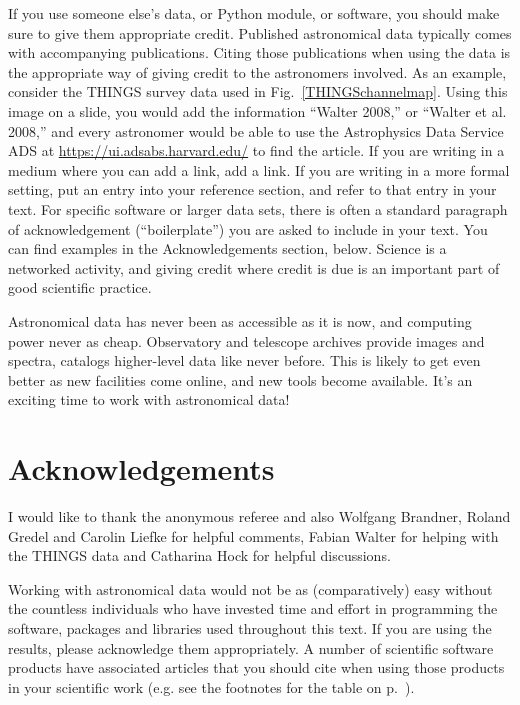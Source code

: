 \documentclass[twocolumn,apj]{openjournal}
\begin{document}
If you use someone else's data, or Python module, or software, you should make sure to give them appropriate credit. Published astronomical data typically comes with accompanying publications. Citing those publications when using the data is the appropriate way of giving credit to the astronomers involved. As an example, consider the THINGS survey data used in Fig.~\ref{THINGSchannelmap}. Using this image on a slide, you would add the information ``Walter 2008,'' or ``Walter et al. 2008,'' and every astronomer would be able to use the Astrophysics Data Service ADS at \href{https://ui.adsabs.harvard.edu/}{https://ui.adsabs.harvard.edu/} to find the article. If you are writing in a medium where you can add a link, add a link. If you are writing in a more formal setting, put an entry into your reference section, and refer to that entry in your text. For specific software or larger data sets, there is often a standard paragraph of acknowledgement (``boilerplate'') you are asked to include in your text. You can find examples in the Acknowledgements section, below. Science is a networked activity, and giving credit where credit is due is an important part of good scientific practice.

Astronomical data has never been as accessible as it is now, and computing power never as cheap. Observatory and telescope archives provide images and spectra, catalogs higher-level data like never before. This is likely to get even better as new facilities come online, and new tools become available. It's an exciting time to work with astronomical data!

\section*{Acknowledgements}

I would like to thank the anonymous referee and also Wolfgang Brandner, Roland Gredel and Carolin Liefke for helpful comments, Fabian Walter for helping with the THINGS data and Catharina Hock for helpful discussions.

Working with astronomical data would not be as (comparatively) easy without the countless individuals who have invested time and effort in programming the software, packages and libraries used throughout this text. If you are using the results, please acknowledge them appropriately. A number of scientific software products have associated articles that you should cite when using those products in your scientific work (e.g. see the footnotes for the table on p.~\pageref{ModuleTable}).
\end{document}
